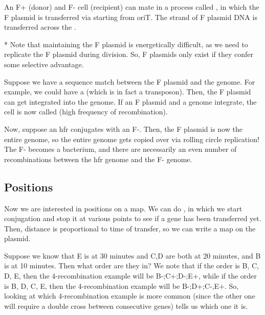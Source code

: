 \begin{fact}
	An F+ (donor) and F- cell (recipient) can mate in a process called , in which the F plasmid is transferred via  starting from oriT.
	The strand of F plasmid DNA is transferred across the .
\end{fact}

\begin{fact}*
	Note that maintaining the F plasmid is energetically difficult, as we need to replicate the F plasmid during division. So, F plasmids only exist if they confer some selective advantage.
\end{fact}

\begin{fact}
	Suppose we have a sequence match between the F plasmid and the genome. For example, we could have a  (which is in fact a transposon).
	Then, the F plasmid can get integrated into the genome.
	If an F plasmid and a genome integrate, the cell is now called  (high frequency of recombination).

	Now, suppose an hfr conjugates with an F-. Then, the F plasmid is now the entire genome, so the entire genome gets copied over via rolling circle replication!
	The F- becomes a  bacterium, and there are necessarily an even number of recombinations between the hfr genome and the F- genome.
\end{fact}

\subsection{Positions}

\begin{fact}
	Now we are interested in positions on a map. We can do , in which we start conjugation and stop it at various points to see if a gene has been transferred yet. Then, distance is proportional to time of transfer, so we can write a map on the plasmid.  
\end{fact}	

\begin{exper}
	Suppose we know that E is at 30 minutes and C,D are both at 20 minutes, and B is at 10 minutes. Then what order are they in? We note that if the order is B, C, D, E, then the 4-recombination example will be B-;C+;D-;E+, while if the order is B, D, C, E, then the 4-recombination example will be B-;D+;C-,E+. So, looking at which 4-recombination example is more common (since the other one will require a double cross between consecutive genes) tells us which one it is.
\end{exper}



